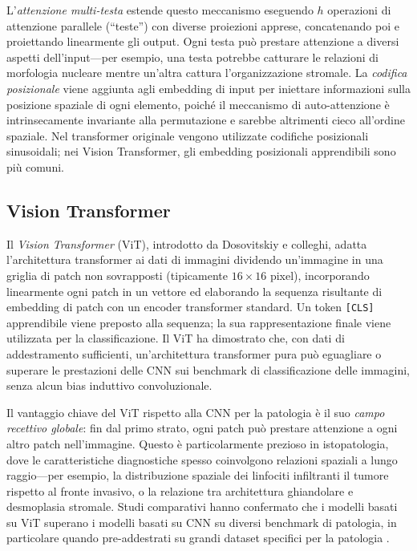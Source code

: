L'\emph{attenzione multi-testa} estende questo meccanismo eseguendo $h$ operazioni di attenzione parallele (``teste'') con diverse proiezioni apprese, concatenando poi e proiettando linearmente gli output. Ogni testa può prestare attenzione a diversi aspetti dell'input---per esempio, una testa potrebbe catturare le relazioni di morfologia nucleare mentre un'altra cattura l'organizzazione stromale. La \emph{codifica posizionale} viene aggiunta agli embedding di input per iniettare informazioni sulla posizione spaziale di ogni elemento, poiché il meccanismo di auto-attenzione è intrinsecamente invariante alla permutazione e sarebbe altrimenti cieco all'ordine spaziale. Nel transformer originale vengono utilizzate codifiche posizionali sinusoidali; nei Vision Transformer, gli embedding posizionali apprendibili sono più comuni.

\subsection{Vision Transformer}

Il \emph{Vision Transformer} (ViT), introdotto da Dosovitskiy e colleghi, adatta l'architettura transformer ai dati di immagini dividendo un'immagine in una griglia di patch non sovrapposti (tipicamente $16 \times 16$ pixel), incorporando linearmente ogni patch in un vettore ed elaborando la sequenza risultante di embedding di patch con un encoder transformer standard. Un token \texttt{[CLS]} apprendibile viene preposto alla sequenza; la sua rappresentazione finale viene utilizzata per la classificazione. Il ViT ha dimostrato che, con dati di addestramento sufficienti, un'architettura transformer pura può eguagliare o superare le prestazioni delle CNN sui benchmark di classificazione delle immagini, senza alcun bias induttivo convoluzionale.

Il vantaggio chiave del ViT rispetto alla CNN per la patologia è il suo \emph{campo recettivo globale}: fin dal primo strato, ogni patch può prestare attenzione a ogni altro patch nell'immagine. Questo è particolarmente prezioso in istopatologia, dove le caratteristiche diagnostiche spesso coinvolgono relazioni spaziali a lungo raggio---per esempio, la distribuzione spaziale dei linfociti infiltranti il tumore rispetto al fronte invasivo, o la relazione tra architettura ghiandolare e desmoplasia stromale. Studi comparativi hanno confermato che i modelli basati su ViT superano i modelli basati su CNN su diversi benchmark di patologia, in particolare quando pre-addestrati su grandi dataset specifici per la patologia \cite{deininger2022}.

